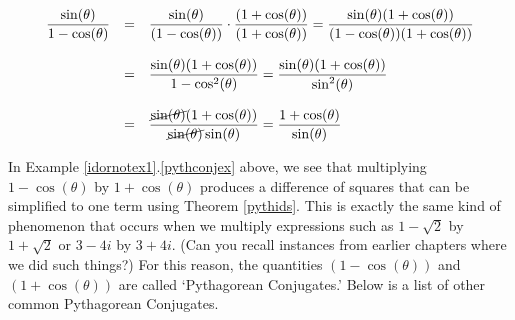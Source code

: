 {\begin{enumerate}
\[ \begin{array}{rcl}


\dfrac{\sin(\theta)}{1 - \cos(\theta)} & = & \dfrac{\sin(\theta)}{(1 - \cos(\theta))} \cdot \dfrac{(1 + \cos(\theta))}{(1 + \cos(\theta))} = \dfrac{\sin(\theta)(1 + \cos(\theta))}{(1 - \cos(\theta))(1 + \cos(\theta))} \\ [.25in]
& = & \dfrac{\sin(\theta)(1 + \cos(\theta))}{1 - \cos^{2}(\theta)} = \dfrac{\sin(\theta)(1 + \cos(\theta))}{\sin^{2}(\theta)} \\ [.25in]
& = & \dfrac{\cancel{\sin(\theta)}(1 + \cos(\theta))}{\cancel{\sin(\theta)}\sin(\theta)} = \dfrac{1 + \cos(\theta)}{\sin(\theta)} \end{array} \]



\end{enumerate}
}

\medskip

In Example \ref{idornotex1}.\ref{pythconjex} above,  we see that multiplying  $1-\cos(\theta)$ by $1+\cos(\theta)$ produces a difference of squares that can be simplified to one term using Theorem \ref{pythids}.  This is exactly the same kind of phenomenon that occurs when we multiply expressions such as $1 - \sqrt{2}$ by $1+\sqrt{2}$ or $3 - 4i$ by $3+4i$. (Can you recall instances from earlier chapters where we did such things?) For this reason, the quantities $(1-\cos(\theta))$ and $(1+\cos(\theta))$ are called `Pythagorean Conjugates.'  Below is a list of other common Pythagorean Conjugates.  

\smallskip


